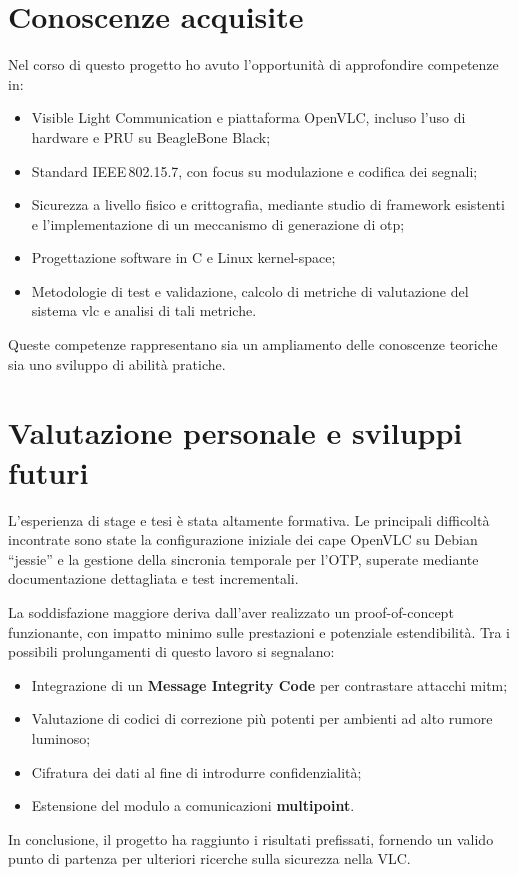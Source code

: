 \section{Conoscenze acquisite}
Nel corso di questo progetto ho avuto l'opportunità di approfondire competenze in:
\begin{itemize}
  \item Visible Light Communication e piattaforma OpenVLC, incluso l'uso di hardware e PRU su BeagleBone Black;
  \item Standard IEEE\,802.15.7, con focus su modulazione e codifica dei segnali;
  \item Sicurezza a livello fisico e crittografia, mediante studio di framework esistenti e l'implementazione di un meccanismo di generazione di \gls{otp};
  \item Progettazione software in C e Linux kernel-space;
  \item Metodologie di test e validazione, calcolo di metriche di valutazione del sistema \gls{vlc} e analisi di tali metriche.
\end{itemize}
Queste competenze rappresentano sia un ampliamento delle conoscenze teoriche sia uno sviluppo di abilità pratiche.

\section{Valutazione personale e sviluppi futuri}
L'esperienza di stage e tesi è stata altamente formativa. Le principali difficoltà incontrate sono state la configurazione iniziale dei cape OpenVLC su Debian “jessie” e la gestione della sincronia temporale per l'OTP, superate mediante documentazione dettagliata e test incrementali.

La soddisfazione maggiore deriva dall'aver realizzato un proof-of-concept funzionante, con impatto minimo sulle prestazioni e potenziale estendibilità. Tra i possibili prolungamenti di questo lavoro si segnalano:
\begin{itemize}
  \item Integrazione di un \textbf{Message Integrity Code} per contrastare attacchi \gls{mitm};
  \item Valutazione di codici di correzione più potenti per ambienti ad alto rumore luminoso;
  \item Cifratura dei dati al fine di introdurre confidenzialità;
  \item Estensione del modulo a comunicazioni \textbf{multipoint}.
\end{itemize}

\noindent In conclusione, il progetto ha raggiunto i risultati prefissati, fornendo un valido punto di partenza per ulteriori ricerche sulla sicurezza nella VLC.
